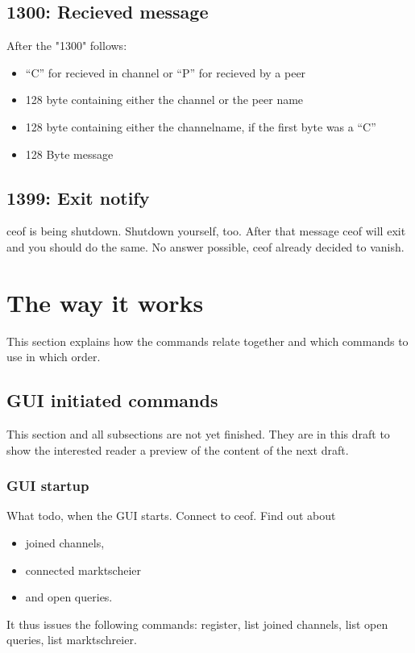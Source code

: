 \documentclass[12pt,a4paper]{article}
\begin{document}
\subsection{1300: Recieved message}
After the "1300" follows:
\begin{itemize}
\item "`C"' for recieved in channel or "`P"' for recieved by a peer
\item 128 byte containing either the channel or the peer name
\item 128 byte containing either the channelname, if the first byte was a "`C"'
\item 128 Byte message
\end{itemize}
\subsection{1399: Exit notify}
ceof is being shutdown.
Shutdown yourself, too.
After that message ceof will exit and you should do the same.
No answer possible, ceof already decided to vanish.
\section{The way it works}
This section explains how the commands relate together and which commands to use
in which order.

\subsection{GUI initiated commands}
This section and all subsections are not yet finished. They
are in this draft to show the interested reader a preview of the
content of the next draft.
\subsubsection{GUI startup}
What todo, when the GUI starts.
Connect to ceof. Find out about
\begin{itemize}
\item joined channels,
\item connected marktscheier
\item and open queries.
\end{itemize}
It thus issues the following commands:
register, list joined channels, list open queries, list marktschreier.
\end{document}
